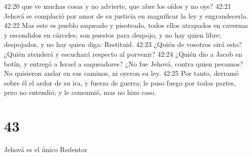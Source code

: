 42:20 que ve muchas cosas y no advierte, que abre los oídos y no oye?  
42:21 Jehová se complació por amor de su justicia en magnificar la ley y engrandecerla.  
42:22 Mas este es pueblo saqueado y pisoteado, todos ellos atrapados en cavernas y escondidos en cárceles; son puestos para despojo, y no hay quien libre; despojados, y no hay quien diga: Restituid.  
42:23 ¿Quién de vosotros oirá esto? ¿Quién atenderá y escuchará respecto al porvenir?  
42:24 ¿Quién dio a Jacob en botín, y entregó a Israel a saqueadores? ¿No fue Jehová, contra quien pecamos? No quisieron andar en sus caminos, ni oyeron su ley.  
42:25 Por tanto, derramó sobre él el ardor de su ira, y fuerza de guerra; le puso fuego por todas partes, pero no entendió; y le consumió, mas no hizo caso.  

\chapter{43}

Jehová es el único Redentor  

